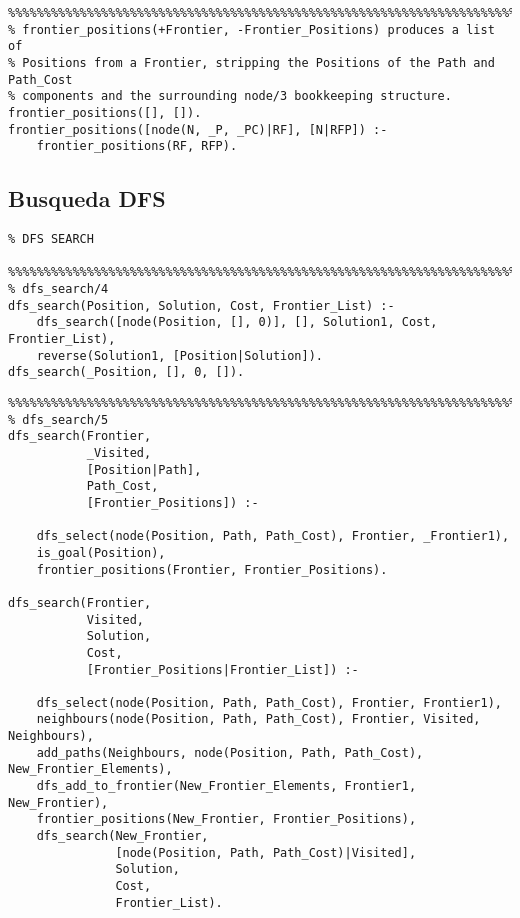 \documentclass[a4paper,12pt]{report}
\begin{document}
\begin{verbatim}
%%%%%%%%%%%%%%%%%%%%%%%%%%%%%%%%%%%%%%%%%%%%%%%%%%%%%%%%%%%%%%%%%%%%%%%%%%%%%%%
% frontier_positions(+Frontier, -Frontier_Positions) produces a list of
% Positions from a Frontier, stripping the Positions of the Path and Path_Cost
% components and the surrounding node/3 bookkeeping structure.
frontier_positions([], []).
frontier_positions([node(N, _P, _PC)|RF], [N|RFP]) :-
    frontier_positions(RF, RFP).

\end{verbatim}

\subsection{Busqueda DFS}

\begin{verbatim}
% DFS SEARCH

%%%%%%%%%%%%%%%%%%%%%%%%%%%%%%%%%%%%%%%%%%%%%%%%%%%%%%%%%%%%%%%%%%%%%%%%%%%%%%%
% dfs_search/4
dfs_search(Position, Solution, Cost, Frontier_List) :-
    dfs_search([node(Position, [], 0)], [], Solution1, Cost, Frontier_List),
    reverse(Solution1, [Position|Solution]).
dfs_search(_Position, [], 0, []).

\end{verbatim}

\begin{verbatim}
%%%%%%%%%%%%%%%%%%%%%%%%%%%%%%%%%%%%%%%%%%%%%%%%%%%%%%%%%%%%%%%%%%%%%%%%%%%%%%%
% dfs_search/5
dfs_search(Frontier,
           _Visited,
           [Position|Path],
           Path_Cost,
           [Frontier_Positions]) :-

    dfs_select(node(Position, Path, Path_Cost), Frontier, _Frontier1),
    is_goal(Position),
    frontier_positions(Frontier, Frontier_Positions).

dfs_search(Frontier,
           Visited,
           Solution,
           Cost,
           [Frontier_Positions|Frontier_List]) :-

    dfs_select(node(Position, Path, Path_Cost), Frontier, Frontier1),
    neighbours(node(Position, Path, Path_Cost), Frontier, Visited, Neighbours),
    add_paths(Neighbours, node(Position, Path, Path_Cost), New_Frontier_Elements),
    dfs_add_to_frontier(New_Frontier_Elements, Frontier1, New_Frontier),
    frontier_positions(New_Frontier, Frontier_Positions),
    dfs_search(New_Frontier,
               [node(Position, Path, Path_Cost)|Visited],
               Solution,
               Cost,
               Frontier_List).

\end{verbatim}
\end{document}
